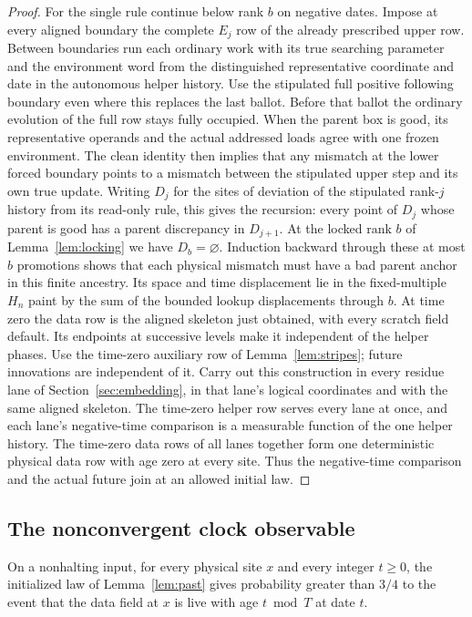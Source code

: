 \begin{proof}
For the single rule continue below rank \(b\) on negative dates. Impose at every aligned boundary the complete \(E_j\) row of the already prescribed upper row. Between boundaries run each ordinary work with its true searching parameter and the environment word from the distinguished representative coordinate and date in the autonomous helper history. Use the stipulated full positive following boundary even where this replaces the last ballot. Before that ballot the ordinary evolution of the full row stays fully occupied. When the parent box is good, its representative operands and the actual addressed loads agree with one frozen environment. The clean identity then implies that any mismatch at the lower forced boundary points to a mismatch between the stipulated upper step and its own true update. Writing \(D_j\) for the sites of deviation of the stipulated rank-\(j\) history from its read-only rule, this gives the recursion: every point of \(D_j\) whose parent is good has a parent discrepancy in \(D_{j+1}\). At the locked rank \(b\) of Lemma~\ref{lem:locking} we have \(D_b=\varnothing\). Induction backward through these at most \(b\) promotions shows that each physical mismatch must have a bad parent anchor in this finite ancestry. Its space and time displacement lie in the fixed-multiple \(H_n\) paint by the sum of the bounded lookup displacements through \(b\). At time zero the data row is the aligned skeleton just obtained, with every scratch field default. Its endpoints at successive levels make it independent of the helper phases. Use the time-zero auxiliary row of Lemma~\ref{lem:stripes}; future innovations are independent of it. Carry out this construction in every residue lane of Section~\ref{sec:embedding}, in that lane's logical coordinates and with the same aligned skeleton. The time-zero helper row serves every lane at once, and each lane's negative-time comparison is a measurable function of the one helper history. The time-zero data rows of all lanes together form one deterministic physical data row with age zero at every site. Thus the negative-time comparison and the actual future join at an allowed initial law.
\end{proof}

\subsection{The nonconvergent clock observable}\label{sec:witness}

\begin{lemma}\label{lem:clock-witness}
On a nonhalting input, for every physical site \(x\) and every integer \(t\ge0\), the initialized law of Lemma~\ref{lem:past} gives probability greater than \(3/4\) to the event that the data field at \(x\) is live with age \(t\bmod T\) at date \(t\).
\end{lemma}


